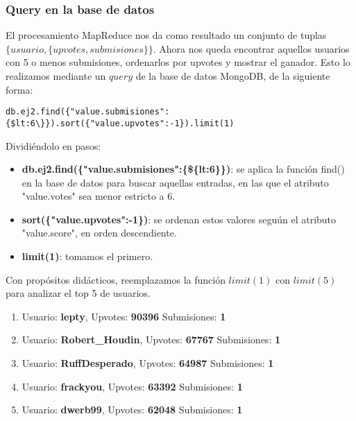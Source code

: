 \subsubsection{Query en la base de datos}

El procesamiento MapReduce nos da como resultado un conjunto de tuplas $\{usuario, \{ upvotes, submisiones \}\}$. Ahora nos queda encontrar aquellos usuarios con 5 o menos submisiones, ordenarlos por upvotes y mostrar el ganador. Esto lo realizamos mediante un $query$ de la base de datos MongoDB, de la siguiente forma:

\vspace{2mm}

\begin{lstlisting}
db.ej2.find({"value.submisiones":{$lt:6\}}).sort({"value.upvotes":-1}).limit(1)
\end{lstlisting}

Dividi\'endolo en pasos:

\begin{itemize}

\item \textbf{db.ej2.find(\{"value.submisiones":\{\$\{lt:6\}\})}: se aplica la funci\'on find() en la base de datos para buscar aquellas entradas, en las que el atributo "value.votes" sea menor estricto a 6.

\item \textbf{sort(\{"value.upvotes":-1\})}: se ordenan estos valores segu\'un el atributo "value.score", en orden descendiente.

\item \textbf{limit(1)}: tomamos el primero.

\end{itemize}

Con prop\'ositos did\'acticos, reemplazamos la funci\'on $limit(1)$ con $limit(5)$ para analizar el top 5 de usuarios.

\begin{enumerate}

\item Usuario: \textbf{lepty}, Upvotes: \textbf{90396} Submisiones: \textbf{1}
\item Usuario: \textbf{Robert\_Houdin}, Upvotes: \textbf{67767} Submisiones: \textbf{1}
\item Usuario: \textbf{RuffDesperado}, Upvotes: \textbf{64987} Submisiones: \textbf{1}
\item Usuario: \textbf{frackyou}, Upvotes: \textbf{63392} Submisiones: \textbf{1}
\item Usuario: \textbf{dwerb99}, Upvotes: \textbf{62048} Submisiones: \textbf{1}

\end{enumerate}

